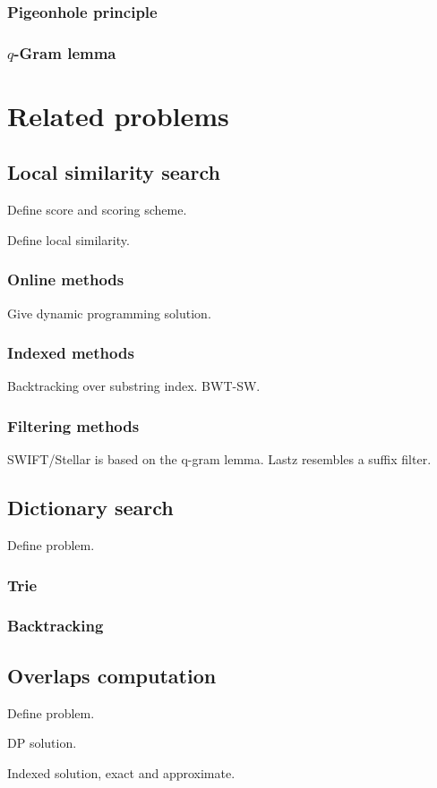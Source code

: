 \subsubsection{Pigeonhole principle}

\subsubsection{$q$-Gram lemma}


\section{Related problems}


\subsection{Local similarity search}

Define score and scoring scheme.

Define local similarity.

\subsubsection{Online methods}
Give dynamic programming solution.

\subsubsection{Indexed methods}
Backtracking over substring index. BWT-SW.

\subsubsection{Filtering methods}
SWIFT/Stellar is based on the q-gram lemma.
Lastz resembles a suffix filter.



\subsection{Dictionary search}

Define problem.

\subsubsection{Trie}

\subsubsection{Backtracking}


\subsection{Overlaps computation}

Define problem.

DP solution.

Indexed solution, exact and approximate.


